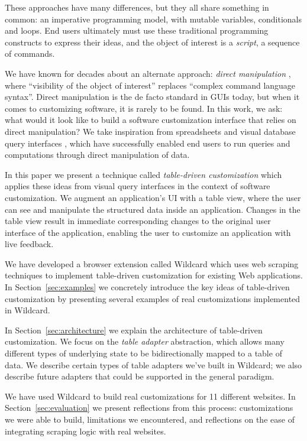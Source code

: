 \documentclass[sigplan,10pt,anonymous,review]{acmart}
\begin{document}
These approaches have many differences, but they all share something in
common: an imperative programming model, with mutable variables,
conditionals and loops. End users ultimately must use these traditional
programming constructs to express their ideas, and the object of
interest is a \emph{script}, a sequence of commands.

We have known for decades about an alternate approach: \emph{direct
manipulation} \citep{shneiderman1983}, where ``visibility of the object
of interest'' replaces ``complex command language syntax''. Direct
manipulation is the de facto standard in GUIs today, but when it comes
to customizing software, it is rarely to be found. In this work, we ask:
what would it look like to build a software customization interface that
relies on direct manipulation? We take inspiration from spreadsheets and
visual database query interfaces \citep{2020a, bakke2016}, which have
successfully enabled end users to run queries and computations through
direct manipulation of data.

In this paper we present a technique called \emph{table-driven
customization} which applies these ideas from visual query interfaces in
the context of software customization. We augment an application's UI
with a table view, where the user can see and manipulate the structured
data inside an application. Changes in the table view result in
immediate corresponding changes to the original user interface of the
application, enabling the user to customize an application with live
feedback.

We have developed a browser extension called Wildcard which uses web
scraping techniques to implement table-driven customization for existing
Web applications. In Section~\ref{sec:examples} we concretely introduce
the key ideas of table-driven customization by presenting several
examples of real customizations implemented in Wildcard.

In Section~\ref{sec:architecture} we explain the architecture of
table-driven customization. We focus on the \emph{table adapter}
abstraction, which allows many different types of underlying state to be
bidirectionally mapped to a table of data. We describe certain types of
table adapters we've built in Wildcard; we also describe future adapters
that could be supported in the general paradigm.

We have used Wildcard to build real customizations for 11 different
websites. In Section~\ref{sec:evaluation} we present reflections from
this process: customizations we were able to build, limitations we
encountered, and reflections on the ease of integrating scraping logic
with real websites.
\end{document}
